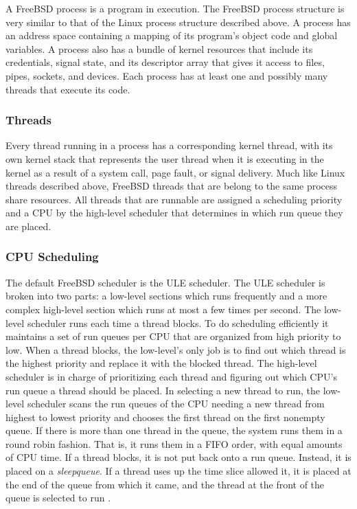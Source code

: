 \documentclass[onecolumn,draftclsnofoot, 10pt, compsoc]{IEEEtran}
\begin{document}
			A FreeBSD process is a program in execution. The FreeBSD process structure is very similar to that of the Linux process structure described above. A process has an address space containing a mapping of its program’s object code and global variables. A process also has a bundle of kernel resources that include its credentials, signal state, and its descriptor array that gives it access to files, pipes, sockets, and devices. Each process has at least one and possibly many threads that execute its code. 
		\subsubsection{Threads}
			Every thread running in a process has a corresponding kernel thread, with its own kernel stack that represents the user thread when it is executing in the kernel as a result of a system call, page fault, or signal delivery. Much like Linux threads described above, FreeBSD threads that are belong to the same process share resources.
			All threads that are runnable are assigned a scheduling priority and a CPU by the high-level scheduler that determines in which run queue they are placed. 
		
		\subsubsection{CPU Scheduling}
			The default FreeBSD scheduler is the ULE scheduler.
			The ULE scheduler is broken into two parts: a low-level sections which runs frequently and a more complex high-level section which runs at most a few times per second.
			The low-level scheduler runs each time a thread blocks.
			To do scheduling efficiently it maintains a set of run queues per CPU that are organized from high priority to low.
			When a thread blocks, the low-level's only job is to find out which thread is the highest priority and replace it with the blocked thread. 
			The high-level scheduler is in charge of prioritizing each thread and figuring out which CPU's run queue a thread should be placed.
			In selecting a new thread to run, the low-level scheduler scans the run queues of the CPU needing a new thread from highest to lowest priority and chooses the first thread on the first nonempty queue.
			If there is more than one thread in the queue, the system runs them in a round robin fashion. 
			That is, it runs them in a FIFO order, with equal amounts of CPU time. 
			If a thread blocks, it is not put back onto a run queue. 
			Instead, it is placed on a \textit{sleepqueue}. 
			If a thread uses up the time slice allowed it, it is placed at the end of the queue from which it came, and the thread at the front of the queue is selected to run \cite{freeBSDScheduler}.
	
\end{document}
